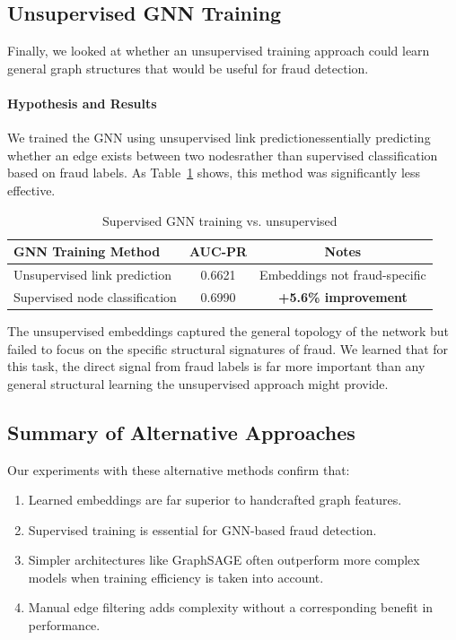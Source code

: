 \subsection{Unsupervised GNN Training}

Finally, we looked at whether an unsupervised training approach could learn general graph structures that would be useful for fraud detection.

\paragraph{Hypothesis and Results}
We trained the GNN using unsupervised link predictionessentially predicting whether an edge exists between two nodesrather than supervised classification based on fraud labels. As Table~\ref{tab:unsupervised_results} shows, this method was significantly less effective.

\begin{table}[h]
\centering
\caption{Supervised GNN training vs. unsupervised}
\label{tab:unsupervised_results}
\begin{tabular}{lcc}
\hline
\textbf{GNN Training Method} & \textbf{AUC-PR} & \textbf{Notes} \\
\hline
Unsupervised link prediction & 0.6621 & Embeddings not fraud-specific \\
Supervised node classification & 0.6990 & \textbf{+5.6\% improvement} \\
\hline
\end{tabular}
\end{table}

The unsupervised embeddings captured the general topology of the network but failed to focus on the specific structural signatures of fraud. We learned that for this task, the direct signal from fraud labels is far more important than any general structural learning the unsupervised approach might provide.

\subsection{Summary of Alternative Approaches}

Our experiments with these alternative methods confirm that:
\begin{enumerate}
    \item Learned embeddings are far superior to handcrafted graph features.
    \item Supervised training is essential for GNN-based fraud detection.
    \item Simpler architectures like GraphSAGE often outperform more complex models when training efficiency is taken into account.
    \item Manual edge filtering adds complexity without a corresponding benefit in performance.
\end{enumerate}
